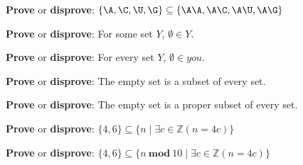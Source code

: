 
{\bf Prove} or {\bf  disprove}: $\{ \A,  \C,  \U,  \G\} \subseteq \{ \A\A, \A\C, \A\U, \A\G \}$ 

\vspace{150pt}

{\bf Prove} or {\bf  disprove}: For some set $Y$, $\emptyset \in Y$.

\vspace{150pt}

{\bf Prove} or {\bf  disprove}: For every set $Y$, $\emptyset \in you$.

\vspace{150pt}

{\bf Prove} or {\bf  disprove}: The empty set is a subset of every set.

\vspace{150pt}

{\bf Prove} or {\bf  disprove}: The empty set is a proper subset of every set.

\vspace{150pt}

{\bf Prove} or {\bf  disprove}: $\{ 4, 6 \} \subseteq \{ n \mid  \exists c \in \mathbb{Z} ( n = 4c) \} $

\vspace{150pt}

{\bf Prove} or {\bf  disprove}: $\{ 4, 6 \} \subseteq \{ n ~\textbf{mod}~10 \mid  \exists c \in \mathbb{Z} ( n = 4c) \} $

\vspace{150pt}

